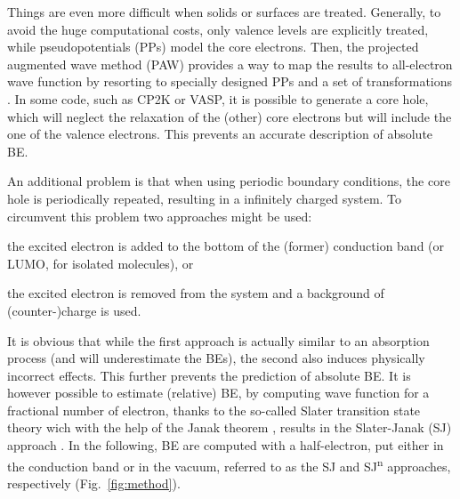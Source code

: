 \documentclass[12pt,a4paper]{article}
\begin{document}
Things are even more difficult when solids or surfaces are treated. Generally, to avoid the huge computational costs, only valence levels are explicitly treated, while pseudopotentials (PPs) model the core electrons. Then, the projected augmented wave method (PAW) provides a way to map the results to all-electron wave function by resorting to specially designed PPs and a set of transformations \cite{blochlProjectorAugmentedwaveMethod1994}. In some code, such as CP2K or VASP, it is possible to generate a core hole, which will neglect the relaxation of the (other) core electrons but will include the one of the valence electrons. This prevents an accurate description of absolute BE.

An additional problem is that when using periodic boundary conditions, the core hole is periodically repeated, resulting in a infinitely charged system. To circumvent this problem two approaches might be used: \begin{inparaenum}[a)]
	\item the excited electron is added to the bottom of the (former) conduction band (or LUMO, for isolated molecules), or
	\item the excited electron is removed from the system and a background of (counter-)charge is used.
\end{inparaenum}
It is obvious that while the first approach is actually similar to an absorption process (and will underestimate the BEs), the second also induces physically incorrect effects. This further prevents the prediction of absolute BE.
It is however possible to estimate (relative) BE, by computing wave function for a fractional number of electron, thanks to the so-called Slater transition state theory wich with the help of the Janak theorem \cite{janakProofThatFrac1978}, results in the Slater-Janak (SJ) approach \cite{hiraoImprovedSlaterTransition2021}. In the following, BE are computed with a half-electron, put either in the conduction band or in the vacuum, referred to as the SJ and SJ\textsuperscript{n} approaches, respectively (Fig.~\ref{fig:method}).
	
\end{document}

